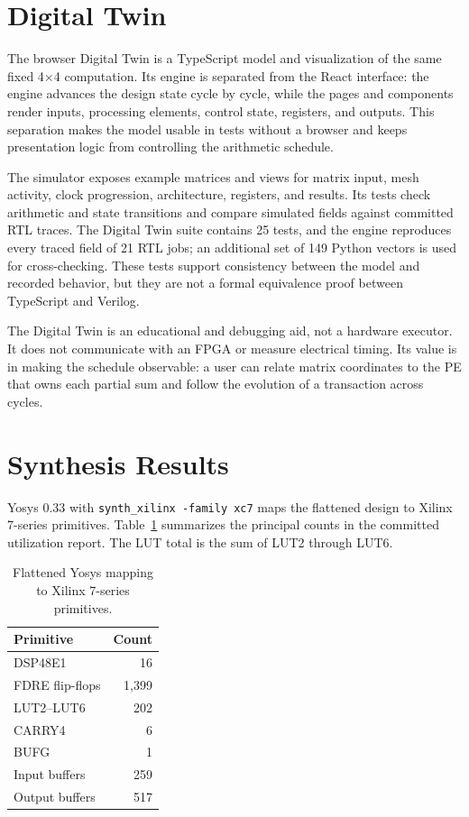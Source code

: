 \documentclass[conference]{IEEEtran}
\begin{document}
\section{Digital Twin}
The browser Digital Twin is a TypeScript model and visualization of the same fixed 4$\times$4 computation. Its engine
is separated from the React interface: the engine advances the design state cycle by cycle, while the pages and
components render inputs, processing elements, control state, registers, and outputs. This separation makes the model
usable in tests without a browser and keeps presentation logic from controlling the arithmetic schedule.

The simulator exposes example matrices and views for matrix input, mesh activity, clock progression, architecture,
registers, and results. Its tests check arithmetic and state transitions and compare simulated fields against committed
RTL traces. The Digital Twin suite contains 25 tests, and the engine reproduces every traced field of 21 RTL jobs; an
additional set of 149 Python vectors is used for cross-checking. These tests support consistency between the
model and recorded behavior, but they are not a formal equivalence proof between TypeScript and Verilog.

The Digital Twin is an educational and debugging aid, not a hardware executor. It does not communicate with an FPGA
or measure electrical timing. Its value is in making the schedule observable: a user can relate matrix coordinates to
the PE that owns each partial sum and follow the evolution of a transaction across cycles.

\section{Synthesis Results}
Yosys 0.33 with \texttt{synth\_xilinx -family xc7} maps the flattened design to Xilinx 7-series primitives. Table~\ref{tab:synth}
summarizes the principal counts in the committed utilization report. The LUT total is the sum of LUT2 through LUT6.
\begin{table}[t]\centering\caption{Flattened Yosys mapping to Xilinx 7-series primitives.}\label{tab:synth}
\begin{tabular}{@{}lr@{}}\toprule
Primitive & Count\\\midrule
DSP48E1 & 16\\
FDRE flip-flops & 1,399\\
LUT2--LUT6 & 202\\
CARRY4 & 6\\
BUFG & 1\\
Input buffers & 259\\
Output buffers & 517\\\bottomrule
\end{tabular}\end{table}
\end{document}
